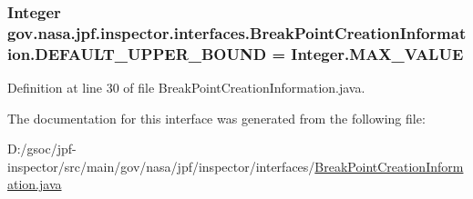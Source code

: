 \subsubsection[{\texorpdfstring{D\+E\+F\+A\+U\+L\+T\+\_\+\+U\+P\+P\+E\+R\+\_\+\+B\+O\+U\+ND}{DEFAULT_UPPER_BOUND}}]{\setlength{\rightskip}{0pt plus 5cm}Integer gov.\+nasa.\+jpf.\+inspector.\+interfaces.\+Break\+Point\+Creation\+Information.\+D\+E\+F\+A\+U\+L\+T\+\_\+\+U\+P\+P\+E\+R\+\_\+\+B\+O\+U\+ND = Integer.\+M\+A\+X\+\_\+\+V\+A\+L\+UE}\hypertarget{interfacegov_1_1nasa_1_1jpf_1_1inspector_1_1interfaces_1_1_break_point_creation_information_af917e7de77b2a6fc93c24e1c5a4a5759}{}\label{interfacegov_1_1nasa_1_1jpf_1_1inspector_1_1interfaces_1_1_break_point_creation_information_af917e7de77b2a6fc93c24e1c5a4a5759}


Definition at line 30 of file Break\+Point\+Creation\+Information.\+java.



The documentation for this interface was generated from the following file\+:\begin{DoxyCompactItemize}
\item 
D\+:/gsoc/jpf-\/inspector/src/main/gov/nasa/jpf/inspector/interfaces/\hyperlink{_break_point_creation_information_8java}{Break\+Point\+Creation\+Information.\+java}\end{DoxyCompactItemize}
